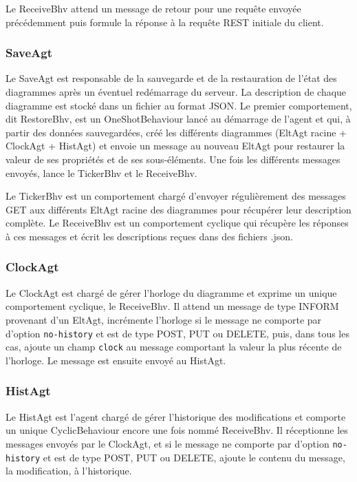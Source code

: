 Le ReceiveBhv attend un message de retour pour une requête envoyée précédemment puis formule la réponse à la requête REST initiale du client.

\subsubsection{SaveAgt}
Le SaveAgt est responsable de la sauvegarde et de la restauration de l'état des diagrammes après un éventuel redémarrage du serveur.
La description de chaque diagramme est stocké dans un fichier au format JSON.
Le premier comportement, dit RestoreBhv, est un OneShotBehaviour lancé au démarrage de l'agent et qui, à partir des données sauvegardées, créé les différents diagrammes (EltAgt racine + ClockAgt + HistAgt) et envoie un message au nouveau EltAgt pour restaurer la valeur de ses propriétés et de ses sous-éléments.
Une fois les différents messages envoyés, lance le TickerBhv et le ReceiveBhv.

Le TickerBhv est un comportement chargé d'envoyer régulièrement des messages GET aux différents EltAgt racine des diagrammes pour récupérer leur description complète.
Le ReceiveBhv est un comportement cyclique qui récupère les réponses à ces messages et écrit les descriptions reçues dans des fichiers .json.

\subsubsection{ClockAgt}
Le ClockAgt est chargé de gérer l'horloge du diagramme et exprime un unique comportement cyclique, le ReceiveBhv.
Il attend un message de type INFORM provenant d'un EltAgt, incrémente l'horloge si le message ne comporte par d'option \lstinline$no-history$ et est de type POST, PUT ou DELETE, puis, dans tous les cas, ajoute un champ \lstinline$clock$ au message comportant la valeur la plus récente de l'horloge.
Le message est ensuite envoyé au HistAgt.

\subsubsection{HistAgt}
Le HistAgt est l'agent chargé de gérer l'historique des modifications et comporte un unique CyclicBehaviour encore une fois nommé ReceiveBhv.
Il réceptionne les messages envoyés par le ClockAgt, et si le message ne comporte par d'option \lstinline$no-history$ et est de type POST, PUT ou DELETE, ajoute le contenu du message, la modification, à l'historique.


